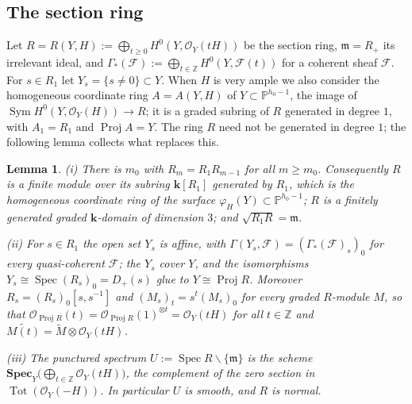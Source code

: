 \documentclass[11pt]{amsart}
\newtheorem{lemma}[theorem]{Lemma}
\theoremstyle{remark}
\theoremstyle{definition}
\newcommand{\PP}{\mathbb{P}}
\newcommand{\ZZ}{\mathbb{Z}}
\newcommand{\bk}{\mathbf{k}}
\newcommand{\cO}{\mathcal{O}}
\newcommand{\cF}{\mathcal{F}}
\DeclareMathOperator{\Proj}{Proj}
\DeclareMathOperator{\Spec}{Spec}
\DeclareMathOperator{\Tot}{Tot}
\DeclareMathOperator{\Sym}{Sym}
\begin{document}
\subsection*{The section ring}
Let $R=R(Y,H):=\bigoplus_{t\ge0}H^0(Y,\cO_Y(tH))$ be the section ring, $\mathfrak m=R_+$ its irrelevant ideal, and $\Gamma_*(\cF):=\bigoplus_{t\in\ZZ}H^0(Y,\cF(t))$ for a coherent sheaf $\cF$. For $s\in R_1$ let $Y_s=\{s\ne0\}\subset Y$. When $H$ is very ample we also consider the homogeneous coordinate ring $A=A(Y,H)$ of $Y\subset\PP^{h_0-1}$, the image of $\Sym H^0(Y,\cO_Y(H))\to R$; it is a graded subring of $R$ generated in degree $1$, with $A_1=R_1$ and $\Proj A=Y$. The ring $R$ need not be generated in degree $1$; the following lemma collects what replaces this.

\begin{lemma}\label{lem:ring}
\textup{(i)} There is $m_0$ with $R_m=R_1R_{m-1}$ for all $m\ge m_0$. Consequently $R$ is a finite module over its subring $\bk[R_1]$ generated by $R_1$, which is the homogeneous coordinate ring of the surface $\varphi_H(Y)\subset\PP^{h_0-1}$; $R$ is a finitely generated graded $\bk$-domain of dimension $3$; and $\sqrt{R_1R}=\mathfrak m$.

\textup{(ii)} For $s\in R_1$ the open set $Y_s$ is affine, with $\Gamma(Y_s,\cF)=(\Gamma_*(\cF)_s)_0$ for every quasi-coherent $\cF$; the $Y_s$ cover $Y$, and the isomorphisms $Y_s\cong\Spec(R_s)_0=D_+(s)$ glue to $Y\cong\Proj R$. Moreover $R_s=(R_s)_0[s,s^{-1}]$ and $(M_s)_t=s^t(M_s)_0$ for every graded $R$-module $M$, so that $\cO_{\Proj R}(t)=\cO_{\Proj R}(1)^{\otimes t}=\cO_Y(tH)$ for all $t\in\ZZ$ and $\widetilde{M(t)}=\widetilde M\otimes\cO_Y(tH)$.

\textup{(iii)} The punctured spectrum $U:=\Spec R\smallsetminus\{\mathfrak m\}$ is the scheme $\mathbf{Spec}_Y\bigl(\bigoplus_{t\in\ZZ}\cO_Y(tH)\bigr)$, the complement of the zero section in $\Tot(\cO_Y(-H))$. In particular $U$ is smooth, and $R$ is normal.
\end{lemma}
\end{document}
